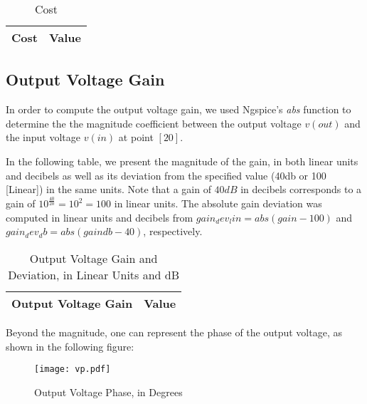 \begin{table}[H]
  \centering
  \begin{tabular}{ |l|r| } 
    \hline    
    {\bf Cost} & {\bf Value} \\ \hline
    
  \end{tabular}
  \caption{Cost}
  \label{tab:cost}
\end{table}


\subsection{Output Voltage Gain}
\label{output_gain}
\par In order to compute the output voltage gain, we used Ngspice's \textit{abs} function to determine the the magnitude coefficient between the output voltage $v(out)$ and the input voltage $v(in)$ at point $[20]$.

\par In the following table, we present the magnitude of the gain, in both linear units and decibels as well as its deviation from the specified value (40db or 100 [Linear]) in the same units.
 Note that a gain of $40dB$ in decibels corresponds to a gain of $10^{\frac{40}{20}}=10^2=100$ in linear units.
 The absolute gain deviation was computed in linear units and decibels from $gain_dev_lin= abs(gain-100)$ and $gain_dev_db = abs(gaindb-40)$, respectively. 
 
\begin{table}[H]
  \centering
  \begin{tabular}{|l|r|}
    \hline    
    {\bf Output Voltage Gain} & {\bf Value} \\ \hline
    
  \end{tabular}
  \caption{Output Voltage Gain and Deviation, in Linear Units and dB}
  \label{tab:gain}
\end{table}

\par Beyond the magnitude, one can represent the phase of the output voltage, as shown in the following figure:

\begin{figure}[H] \centering
\texttt{[image: vp.pdf]}
\caption{Output Voltage Phase, in Degrees}
\label{fig:vp}
\end{figure}



